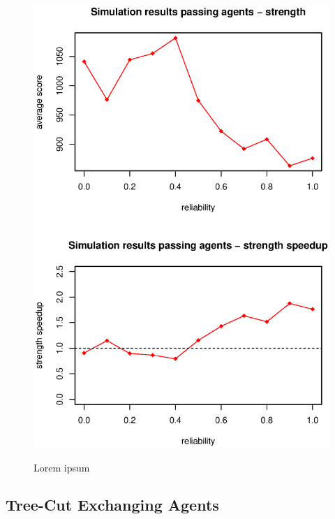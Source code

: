 \begin{figure}
\begin{center}
\includegraphics{img/simulation-passing-unreliable.eps}
\end{center}
\caption{\footnotesize Lorem ipsum}{\footnotesize }
\label{fig_simulation_passing_unreliable}
\end{figure}


\subsection{Tree-Cut Exchanging Agents}


